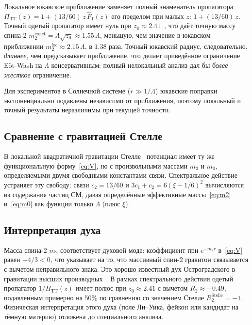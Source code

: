 \documentclass[aps,prd,twocolumn,superscriptaddress,nofootinbib,floatfix]{revtex4-2}
\newcommand{\PiTT}{\Pi_{\mathrm{TT}}}
\begin{document}
Локальное юкавское приближение заменяет полный знаменатель пропагатора
$\PiTT(z) = 1 + (13/60)\,z\,\hat{F}_1(z)$ его пределом при малых $z$:
$1 + (13/60)\,z$. Точный одетый пропагатор имеет нуль при
$z_0 \approx 2.41$~\cite{Alfyorov:2026ff}, что даёт точную массу
спина-2 $m_2^{\mathrm{exact}} = \Lambda\sqrt{z_0} \approx 1.55\,\Lambda$,
меньшую, чем значение в юкавском приближении
$m_2^{\mathrm{loc}} \approx 2.15\,\Lambda$, в $1.38$ раза.
Точный юкавский радиус, следовательно, \emph{длиннее}, чем
предсказывает приближение, что делает приведённое ограничение E\"ot-Wash
на $\Lambda$ консервативным: полный нелокальный анализ дал бы
\emph{более жёсткое} ограничение.

Для экспериментов в Солнечной системе ($r \gg 1/\Lambda$) юкавские
поправки экспоненциально подавлены независимо от приближения, поэтому
локальный и точный результаты неразличимы при текущей точности.

\subsection{Сравнение с гравитацией Стелле}

В локальной квадратичной гравитации
Стелле~\cite{Stelle:1976gc,Stelle:1978} потенциал имеет ту же
функциональную форму~\eqref{eq:V}, но с произвольными массами $m_2$
и $m_0$, определяемыми двумя свободными константами связи.
Спектральное действие устраняет эту свободу: связи
$c_2 = 13/60$ и $3c_1 + c_2 = 6(\xi-1/6)^2$ вычисляются из
содержания частиц СМ, давая определённые эффективные
массы~\eqref{eq:m2} и~\eqref{eq:m0} как функции только $\Lambda$
(плюс $\xi$).

\subsection{Интерпретация духа}

Масса спина-2 $m_2$ соответствует духовой моде: коэффициент при
$e^{-m_2 r}$ в~\eqref{eq:V} равен $-4/3 < 0$, что указывает на то,
что массивный спин-2 гравитон связывается с вычетом неправильного
знака. Это хорошо известный дух Остроградского в гравитации высших
производных~\cite{Stelle:1976gc,Woodard:2015zca}.
В рамках спектрального действия одетый пропагатор
$1/\PiTT(z)$ имеет полюс при $z_0 \approx 2.41$ с вычетом
$R_2 \approx -0.49$, подавленным примерно на 50\% по сравнению
со значением Стелле $R_2^{\mathrm{Stelle}} = -1$.
Физическая интерпретация этого духа (поле Ли--Уика, фейкон или
кандидат на тёмную материю) отложена до специального анализа.
\end{document}
